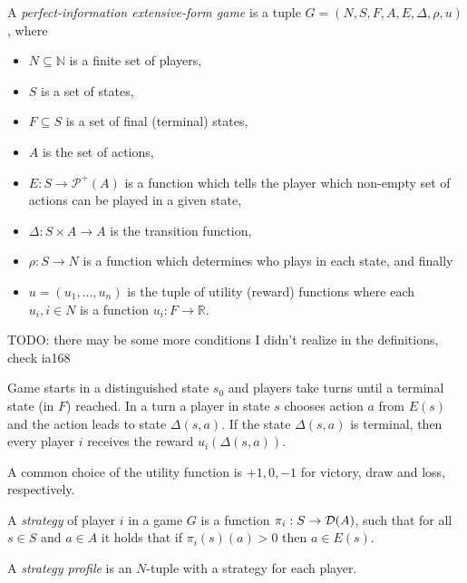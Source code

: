 \begin{definition}
    A {\em perfect-information extensive-form game}
    is a tuple $G = (N, S, F, A, E, \Delta, \rho, u)$,
    where
    \begin{itemize}
        \item $N \subseteq \mathbb{N}$ is a finite set of players,
        \item $S$ is a set of states,
        \item $F \subseteq S$ is a set of final (terminal) states,
        \item $A$ is the set of actions,
        \item $E : S \to \mathcal{P}^+(A)$ is a function which tells the player
            which non-empty set of actions can be played in a given state,
        \item $\Delta : S \times A \to A$ is the transition function,
        \item $\rho : S \to N$ is a function which determines who plays in each state,
            and finally
        \item $u = (u_1,\ldots,u_n)$ is the tuple of
            utility (reward) functions where each $u_i, i \in N$ is a function
            $u_i : F \to \mathbb{R}$.
    \end{itemize}
\end{definition}

TODO: there may be some more conditions I didn't realize in the definitions, check
ia168

Game starts in a distinguished state $s_0$ and players take turns until
a terminal state (in $F$) reached. In a turn a player in state $s$ chooses
action $a$ from $E(s)$ and the action leads to state $\Delta(s,a)$.
If the state $\Delta(s,a)$ is terminal, then every player $i$ receives
the reward $u_i(\Delta(s,a))$.

A common choice of the utility function is $+1, 0, -1$ for victory, draw
and loss, respectively.

\begin{example}
\end{example}

\begin{definition}
    A {\em strategy} of player $i$ in a game $G$ is a function
    $\pi_i : S \to \mathcal{D}(A)$, such that for all $s \in S$ and $a
    \in A$ it holds that if $\pi_i(s)(a) > 0$ then $a \in E(s)$.

    A {\em strategy profile} is an $N$-tuple with a strategy for each player.
\end{definition}

